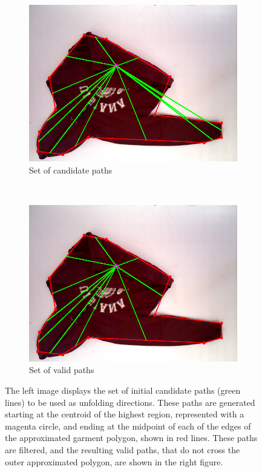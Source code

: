 \begin{figure}[htbp]
	\centering
    \begin{subfigure}[l]{0.49\textwidth}
	    \centering
    	\includegraphics[width=\textwidth]
    	{figures/paths_candidate.png}
    	\caption{Set of candidate paths}
	\end{subfigure}
	~
    \begin{subfigure}[r]{0.49\textwidth}
	    \centering
    	\includegraphics[width=\textwidth]
    	{figures/paths_valid.png}
    	\caption{Set of valid paths}
	\end{subfigure} 
    \caption[Initial candidate paths and valid set of paths.]
    {The left image displays the set of initial candidate paths (green lines) to be used as unfolding directions. These paths are generated starting at the centroid of the highest region, represented with a magenta circle, and ending at the midpoint of each of the edges of the approximated garment polygon, shown in red lines. These paths are filtered, and the resulting valid paths, that do not cross the outer approximated polygon, are shown in the right figure.}
    \label{fig:candidate_paths}
\end{figure}


